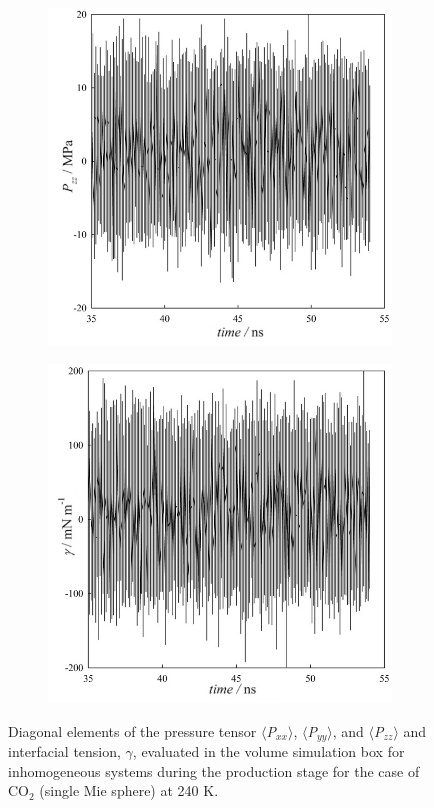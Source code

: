 \documentclass[9pt,bestpractices]{livecoms}
\begin{document}
\begin{figure}
\begin{subfigure}{0.3\textwidth}
	\end{subfigure}
	\begin{subfigure}{0.3\textwidth} %
    \includegraphics[width=1\textwidth]{gfx/fig_15_c.jpeg}
	\end{subfigure}
	\begin{subfigure}{0.3\textwidth} %
    \includegraphics[width=1\textwidth]{gfx/fig_15_d.jpeg}
	\end{subfigure}
\caption{Diagonal elements of the pressure tensor ${\langle}$\textit{P}$_{xx}$${\rangle}$, ${\langle}$\textit{P}$_{yy}$${\rangle}$, and ${\langle}$\textit{P}$_{zz}$${\rangle}$ and interfacial tension, ${\gamma}$, evaluated in the volume simulation box for inhomogeneous systems during the production stage for the case of CO$_{2}$ (single Mie sphere) at 240 K.
}
\label{fig:16}
\end{figure}
\end{document}
